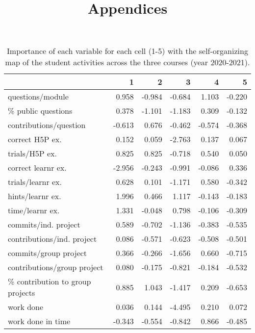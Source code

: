\documentclass[
]{article}
\title{Appendices}
\author{}
\date{\vspace{-2.5em}}
\begin{document}
\maketitle

\begin{table}

\caption{\label{tab:somtab1}\label{tab:tab_som1} Importance of each variable for each cell (1-5) with the self-organizing map of the student activities across the three courses (year 2020-2021).}
\centering
\begin{tabular}[t]{l|r|r|r|r|r}
\hline
  & 1 & 2 & 3 & 4 & 5\\
\hline
questions/module & 0.958 & -0.984 & -0.684 & 1.103 & -0.220\\
\hline
\% public questions & 0.378 & -1.101 & -1.183 & 0.309 & -0.132\\
\hline
contributions/question & -0.613 & 0.676 & -0.462 & -0.574 & -0.368\\
\hline
correct H5P ex. & 0.152 & 0.059 & -2.763 & 0.137 & 0.067\\
\hline
trials/H5P ex. & 0.825 & 0.825 & -0.718 & 0.540 & 0.050\\
\hline
correct learnr ex. & -2.956 & -0.243 & -0.991 & -0.086 & 0.336\\
\hline
trials/learnr ex. & 0.628 & 0.101 & -1.171 & 0.580 & -0.342\\
\hline
hints/learnr ex. & 1.996 & 0.466 & 1.117 & -0.143 & -0.183\\
\hline
time/learnr ex. & 1.331 & -0.048 & 0.798 & -0.106 & -0.309\\
\hline
commits/ind. project & 0.589 & -0.702 & -1.136 & -0.383 & -0.535\\
\hline
contributions/ind. project & 0.086 & -0.571 & -0.623 & -0.508 & -0.501\\
\hline
commits/group project & 0.366 & -0.266 & -1.656 & 0.660 & -0.715\\
\hline
contributions/group project & 0.080 & -0.175 & -0.821 & -0.184 & -0.532\\
\hline
\% contribution to group projects & 0.885 & 1.043 & -1.417 & 0.209 & -0.653\\
\hline
work done & 0.036 & 0.144 & -4.495 & 0.210 & 0.072\\
\hline
work done in time & -0.343 & -0.554 & -0.842 & 0.866 & -0.485\\
\hline
\end{tabular}
\end{table}
\end{document}
